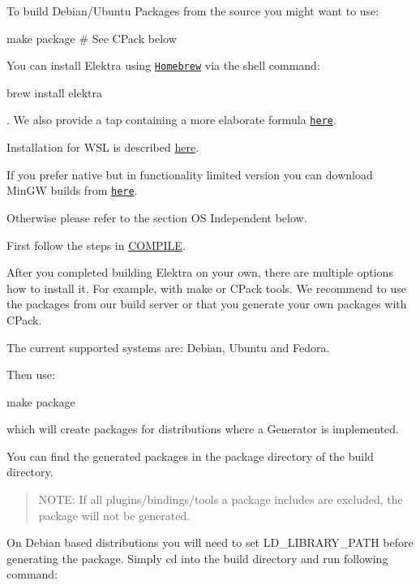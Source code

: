 To build Debian/\+Ubuntu Packages from the source you might want to use\+:


\begin{DoxyCode}
make package # See CPack below
\end{DoxyCode}


You can install Elektra using \href{http://brew.sh}{\tt Homebrew} via the shell command\+:


\begin{DoxyCode}
brew install elektra
\end{DoxyCode}


. We also provide a tap containing a more elaborate formula \href{http://github.com/ElektraInitiative/homebrew-elektra}{\tt here}.

Installation for W\+SL is described \hyperlink{doc_tutorials_contributing-windows_md}{here}.

If you prefer native but in functionality limited version you can download Min\+GW builds from \href{https://build.libelektra.org/job/libelektra/job/master/lastSuccessfulBuild/artifact/artifacts/debian-buster-mingw-w64/elektra.zip}{\tt here}.

Otherwise please refer to the section {\ttfamily OS Independent} below.

First follow the steps in \hyperlink{doc_COMPILE_md}{C\+O\+M\+P\+I\+LE}.

After you completed building Elektra on your own, there are multiple options how to install it. For example, with make or C\+Pack tools. We recommend to use the packages from our build server or that you generate your own packages with C\+Pack.

The current supported systems are\+: Debian, Ubuntu and Fedora.

Then use\+:


\begin{DoxyCode}
make package
\end{DoxyCode}


which will create packages for distributions where a Generator is implemented.

You can find the generated packages in the {\ttfamily package} directory of the build directory.

\begin{quote}
N\+O\+TE\+: If all plugins/bindings/tools a package includes are excluded, the package will not be generated. \end{quote}


On Debian based distributions you will need to set L\+D\+\_\+\+L\+I\+B\+R\+A\+R\+Y\+\_\+\+P\+A\+TH before generating the package. Simply {\ttfamily cd} into the build directory and run following command\+:


